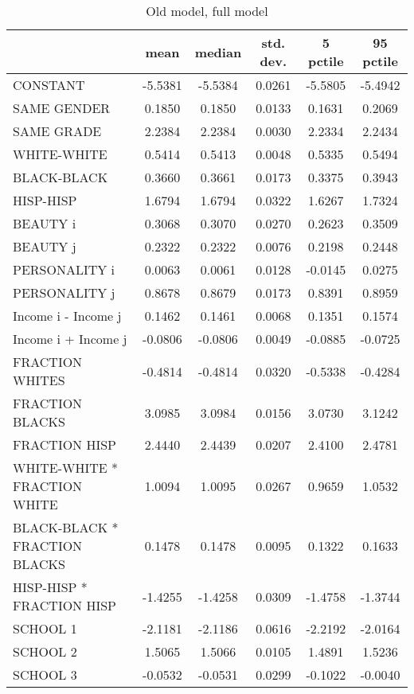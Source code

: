 \documentclass[12pt,letterpaper]{article}
\author{Angelo Mele}
\begin{document}
\begin{small}
\begin{table}[ht]
\caption{Old model, full model}
\centering
\begin{tabular}{l|ccccc}
  \hline
 & mean & median & std. dev. & 5 pctile & 95 pctile \\ 
  \hline
CONSTANT & -5.5381 & -5.5384 & 0.0261 & -5.5805 & -5.4942 \\ 
  SAME GENDER & 0.1850 & 0.1850 & 0.0133 & 0.1631 & 0.2069 \\ 
  SAME GRADE & 2.2384 & 2.2384 & 0.0030 & 2.2334 & 2.2434 \\ 
  WHITE-WHITE & 0.5414 & 0.5413 & 0.0048 & 0.5335 & 0.5494 \\ 
  BLACK-BLACK & 0.3660 & 0.3661 & 0.0173 & 0.3375 & 0.3943 \\ 
  HISP-HISP & 1.6794 & 1.6794 & 0.0322 & 1.6267 & 1.7324 \\ 
  BEAUTY i & 0.3068 & 0.3070 & 0.0270 & 0.2623 & 0.3509 \\ 
  BEAUTY j & 0.2322 & 0.2322 & 0.0076 & 0.2198 & 0.2448 \\ 
  PERSONALITY i & 0.0063 & 0.0061 & 0.0128 & -0.0145 & 0.0275 \\ 
  PERSONALITY j & 0.8678 & 0.8679 & 0.0173 & 0.8391 & 0.8959 \\ 
  Income i - Income j & 0.1462 & 0.1461 & 0.0068 & 0.1351 & 0.1574 \\ 
  Income i + Income j & -0.0806 & -0.0806 & 0.0049 & -0.0885 & -0.0725 \\ 
  FRACTION WHITES & -0.4814 & -0.4814 & 0.0320 & -0.5338 & -0.4284 \\ 
  FRACTION BLACKS & 3.0985 & 3.0984 & 0.0156 & 3.0730 & 3.1242 \\ 
  FRACTION HISP & 2.4440 & 2.4439 & 0.0207 & 2.4100 & 2.4781 \\ 
  WHITE-WHITE * FRACTION WHITE & 1.0094 & 1.0095 & 0.0267 & 0.9659 & 1.0532 \\ 
  BLACK-BLACK * FRACTION BLACKS & 0.1478 & 0.1478 & 0.0095 & 0.1322 & 0.1633 \\ 
  HISP-HISP * FRACTION HISP & -1.4255 & -1.4258 & 0.0309 & -1.4758 & -1.3744 \\ 
  SCHOOL 1 & -2.1181 & -2.1186 & 0.0616 & -2.2192 & -2.0164 \\ 
  SCHOOL 2 & 1.5065 & 1.5066 & 0.0105 & 1.4891 & 1.5236 \\ 
  SCHOOL 3 & -0.0532 & -0.0531 & 0.0299 & -0.1022 & -0.0040 \\ 

\end{tabular}
\end{table}
\end{small}
\end{document}
